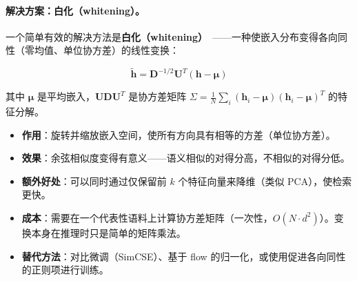 \paragraph{解决方案：白化（whitening）。}
\label{resolution-whitening.}

一个简单有效的解决方法是\textbf{白化（whitening）}~\cite{su2021whitening}——一种使嵌入分布变得各向同性（零均值、单位协方差）的线性变换：

\begin{equation}
\tilde{\mathbf{h}} = \mathbf{D}^{-1/2} \mathbf{U}^T (\mathbf{h} - \boldsymbol{\mu})
\end{equation}

其中 $\boldsymbol{\mu}$ 是平均嵌入，$\mathbf{U}\mathbf{D}\mathbf{U}^T$ 是协方差矩阵 $\Sigma = \frac{1}{N}\sum_i (\mathbf{h}_i - \boldsymbol{\mu})(\mathbf{h}_i - \boldsymbol{\mu})^T$ 的特征分解。

\begin{keybox}[白化的实践]
\begin{itemize}
  \item \textbf{作用}：旋转并缩放嵌入空间，使所有方向具有相等的方差（单位协方差）。
  \item \textbf{效果}：余弦相似度变得有意义——语义相似的对得分高，不相似的对得分低。
  \item \textbf{额外好处}：可以同时通过仅保留前 $k$ 个特征向量来降维（类似 PCA），使检索更快。
  \item \textbf{成本}：需要在一个代表性语料上计算协方差矩阵（一次性，$O(N \cdot d^2)$）。变换本身在推理时只是简单的矩阵乘法。
  \item \textbf{替代方法}：对比微调（SimCSE）、基于 flow 的归一化，或使用促进各向同性的正则项进行训练。
\end{itemize}
\end{keybox}

